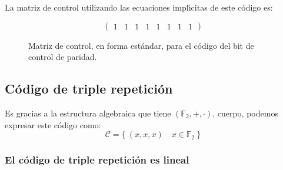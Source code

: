 La matriz de control utilizando las ecuaciones impl\'{\i}citas de este c\'odigo
es:
\begin{figure}[!h]
\begin{displaymath}
\left( \begin{array}{cccccccc}
1&1&1&1&1&1&1&1
\end{array} \right)
\end{displaymath}
\caption{Matriz de control, en forma est\'andar, para el c\'odigo del
bit de control de paridad.}
\end{figure}

%
%
\subsection{C\'odigo de triple repetici\'on}

Es gracias a la estructura algebraica que tiene $(\mathbb{F}_2,+,\cdot )$,
cuerpo, podemos expresar este c\'odigo como:
\begin{displaymath}
\mathcal{C}=\{\ (x,x,x)\quad x\in \mathbb{F}_2\ \}
\end{displaymath}

\subsubsection{El c\'odigo de triple repetici\'on es lineal}

